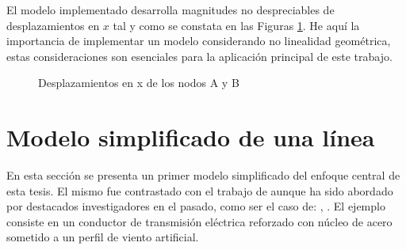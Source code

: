 
El modelo implementado desarrolla magnitudes no despreciables de desplazamientos en $x$ tal y como se constata en las Figuras \ref{fig:RN:RA:DispsXAB}. He aquí  la importancia de implementar un modelo considerando no linealidad geométrica, estas consideraciones son esenciales para la aplicación principal de este trabajo.  


\begingroup
\centering
\begin{figure}[htbp]
	\centering
	\label{fig:RN:RA:DispxB}
	\label{fig:RN:RA:DispxA}
	\caption{Desplazamientos en x de los nodos A y B} \label{fig:RN:RA:DispsXAB}
\end{figure}
\endgroup

\section{Modelo simplificado de una línea}\label{Sec:RN:FotiCable}
En esta sección se presenta un primer modelo simplificado del enfoque central de esta tesis. El mismo fue contrastado con el trabajo de \cite{foti2018finite} aunque ha sido abordado por destacados investigadores en el pasado, como ser el caso de: \cite{luongo1998non}, \cite{martinelli2001numerical}. El ejemplo consiste en un conductor de transmisión eléctrica reforzado con núcleo de acero sometido a un perfil de viento artificial. 

